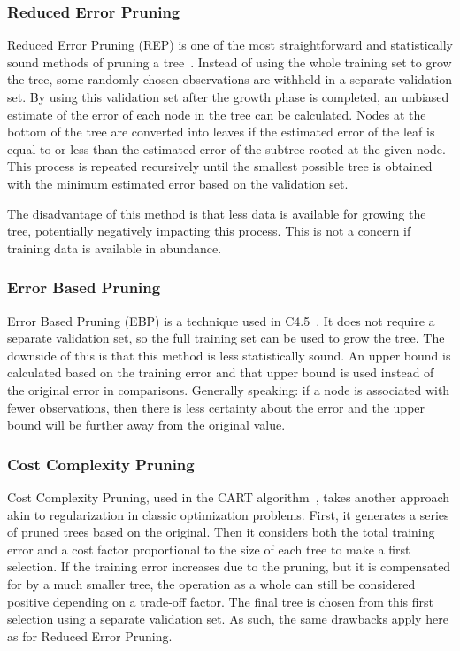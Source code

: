 \subsubsection{Reduced Error Pruning}
Reduced Error Pruning (REP) is one of the most straightforward and statistically sound methods of pruning a tree~\cite{quinlan1987simplifying, repanalysis}. Instead of using the whole training set to grow the tree, some randomly chosen observations are withheld in a separate validation set. By using this validation set after the growth phase is completed, an unbiased estimate of the error of each node in the tree can be calculated. Nodes at the bottom of the tree are converted into leaves if the estimated error of the leaf is equal to or less than the estimated error of the subtree rooted at the given node. This process is repeated recursively until the smallest possible tree is obtained with the minimum estimated error based on the validation set.

The disadvantage of this method is that less data is available for growing the tree, potentially negatively impacting this process. This is not a concern if training data is available in abundance.

\subsubsection{Error Based Pruning}
Error Based Pruning (EBP) is a technique used in C4.5~\cite{c45}. It does not require a separate validation set, so the full training set can be used to grow the tree. The downside of this is that this method is less statistically sound. An upper bound is calculated based on the training error and that upper bound is used instead of the original error in comparisons. Generally speaking: if a node is associated with fewer observations, then there is less certainty about the error and the upper bound will be further away from the original value. %

\subsubsection{Cost Complexity Pruning}
Cost Complexity Pruning, used in the CART algorithm~\cite{cart}, takes another approach akin to regularization in classic optimization problems. First, it generates a series of pruned trees based on the original. Then it considers both the total training error and a cost factor proportional to the size of each tree to make a first selection. If the training error increases due to the pruning, but it is compensated for by a much smaller tree, the operation as a whole can still be considered positive depending on a trade-off factor. The final tree is chosen from this first selection using a separate validation set. As such, the same drawbacks apply here as for Reduced Error Pruning.

